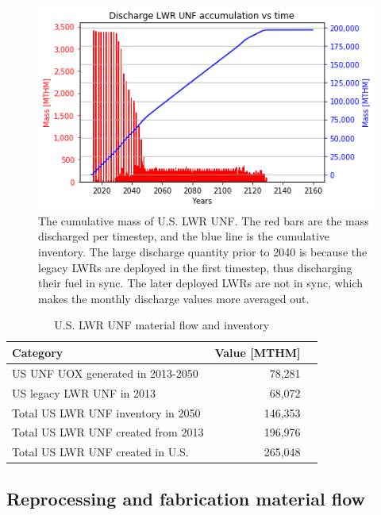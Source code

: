 \begin{figure}[htbp!]
	\begin{center}
		\includegraphics[scale=0.7]{./images/us/us_lwr_unf.png}
	\end{center}
	\caption{The cumulative mass of U.S. \gls{LWR} \gls{UNF}. The red bars are the
			mass discharged per timestep, and the blue line is the cumulative
			inventory. The large discharge quantity prior to 2040 is because the legacy \glspl{LWR}
			are deployed in the first timestep, thus discharging their fuel in sync.
			The later deployed \glspl{LWR} are not in sync, which makes the monthly
			discharge values more averaged out.}
	\label{fig:us_lwr_unf}
\end{figure}

\begin{table}[h]
	\centering
	\caption{U.S. \gls{LWR} \gls{UNF} material flow and inventory}
	\begin{tabular}{lrl}
		\hline
		\textbf{Category} & \textbf{Value [MTHM]} \\
		\hline
		US \gls{UNF} UOX generated in 2013-2050 & 78,281 \\
		US legacy \gls{LWR} \gls{UNF} in 2013 & 68,072 \\
		Total US \gls{LWR} \gls{UNF} inventory in 2050 & 146,353 \\
		Total US \gls{LWR} \gls{UNF} created from 2013 & 196,976 \\
		Total US \gls{LWR} \gls{UNF} created in U.S. & 265,048 \\
		\hline
	\end{tabular}
	\label{tab:us_lwr_unf}
\end{table}


\subsection{Reprocessing and fabrication material flow}

